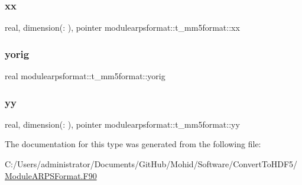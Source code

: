 \subsubsection{\texorpdfstring{xx}{xx}}
{\footnotesize\ttfamily real, dimension(\+:  ), pointer modulearpsformat\+::t\+\_\+mm5format\+::xx\hspace{0.3cm}{\ttfamily [private]}}

\mbox{\label{structmodulearpsformat_1_1t__mm5format_aa22482fc3863630fdc49ce6442c12463}} 
\subsubsection{\texorpdfstring{yorig}{yorig}}
{\footnotesize\ttfamily real modulearpsformat\+::t\+\_\+mm5format\+::yorig\hspace{0.3cm}{\ttfamily [private]}}

\mbox{\label{structmodulearpsformat_1_1t__mm5format_ae84812469c67c437e191ebbadec89aed}} 
\subsubsection{\texorpdfstring{yy}{yy}}
{\footnotesize\ttfamily real, dimension(\+:  ), pointer modulearpsformat\+::t\+\_\+mm5format\+::yy\hspace{0.3cm}{\ttfamily [private]}}



The documentation for this type was generated from the following file\+:\begin{DoxyCompactItemize}
\item 
C\+:/\+Users/administrator/\+Documents/\+Git\+Hub/\+Mohid/\+Software/\+Convert\+To\+H\+D\+F5/\mbox{\hyperlink{_module_a_r_p_s_format_8_f90}{Module\+A\+R\+P\+S\+Format.\+F90}}\end{DoxyCompactItemize}
